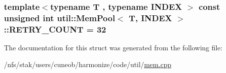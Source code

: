 \hypertarget{structutil_1_1MemPool_abcd02966289aa30c1a42639c143dfbcb}{
\subsubsection[{R\-E\-T\-R\-Y\-\_\-\-C\-O\-U\-N\-T}]{\setlength{\rightskip}{0pt plus 5cm}template$<$typename T , typename I\-N\-D\-E\-X $>$ const unsigned int {\bf util\-::\-Mem\-Pool}$<$ T, I\-N\-D\-E\-X $>$\-::R\-E\-T\-R\-Y\-\_\-\-C\-O\-U\-N\-T = 32}}\label{structutil_1_1MemPool_abcd02966289aa30c1a42639c143dfbcb}


The documentation for this struct was generated from the following file\-:\begin{DoxyCompactItemize}
\item 
/nfs/stak/users/cuneob/harmonize/code/util/\hyperlink{mem_8cpp}{mem.\-cpp}\end{DoxyCompactItemize}
